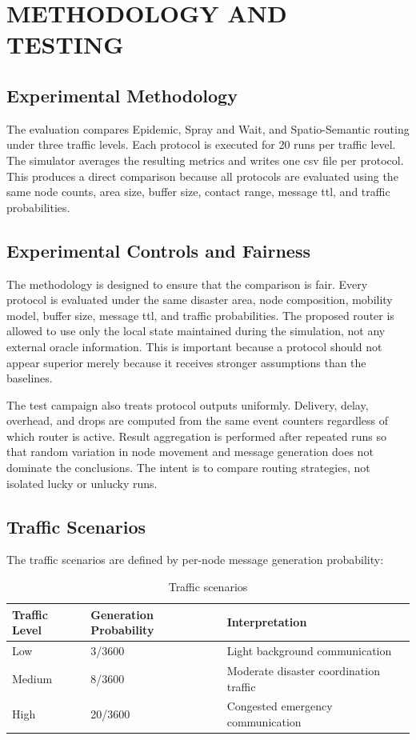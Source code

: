 \chapter{\MakeUppercase{Methodology and Testing}}

\section{Experimental Methodology}
The evaluation compares Epidemic, Spray and Wait, and Spatio-Semantic routing under three traffic levels. Each protocol is executed for 20 runs per traffic level. The simulator averages the resulting metrics and writes one \ac{csv} file per protocol. This produces a direct comparison because all protocols are evaluated using the same node counts, area size, buffer size, contact range, message \ac{ttl}, and traffic probabilities.

\section{Experimental Controls and Fairness}
The methodology is designed to ensure that the comparison is fair. Every protocol is evaluated under the same disaster area, node composition, mobility model, buffer size, message \ac{ttl}, and traffic probabilities. The proposed router is allowed to use only the local state maintained during the simulation, not any external oracle information. This is important because a protocol should not appear superior merely because it receives stronger assumptions than the baselines.

The test campaign also treats protocol outputs uniformly. Delivery, delay, overhead, and drops are computed from the same event counters regardless of which router is active. Result aggregation is performed after repeated runs so that random variation in node movement and message generation does not dominate the conclusions. The intent is to compare routing strategies, not isolated lucky or unlucky runs.

\section{Traffic Scenarios}
The traffic scenarios are defined by per-node message generation probability:

\begin{table}[h!]
	\centering
	\caption{Traffic scenarios}
	\renewcommand{\arraystretch}{1.3}
	\begin{tabular}{|l|l|l|}
		\hline
		\textbf{Traffic Level} & \textbf{Generation Probability} & \textbf{Interpretation} \\
		\hline
		Low & 3/3600 & Light background communication \\
		\hline
		Medium & 8/3600 & Moderate disaster coordination traffic \\
		\hline
		High & 20/3600 & Congested emergency communication \\
		\hline
	\end{tabular}
	\label{tab:traffic_scenarios}
\end{table}

